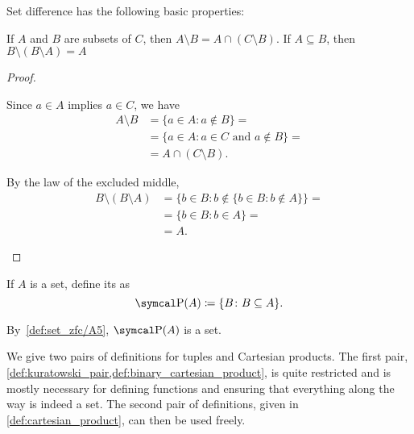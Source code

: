 \begin{proposition}\label{thm:set_difference_properties}
  Set difference has the following basic properties:
  \begin{thmenum}
     If \( A \) and \( B \) are subsets of \( C \), then \( A \setminus B = A \cap (C \setminus B) \).
     If \( A \subseteq B \), then \( B \setminus (B \setminus A) = A \)
  \end{thmenum}
\end{proposition}
\begin{proof}
  \begin{description}
     Since \( a \in A \) implies \( a \in C \), we have
    \begin{align*}
      A \setminus B
      &=
      \{ a \in A \colon a \not\in B \}
      = \\ &=
      \{ a \in A \colon a \in C \text{ and } a \not\in B \}
      = \\ &=
      A \cap (C \setminus B).
    \end{align*}

     By the law of the excluded middle,
    \begin{align*}
      B \setminus (B \setminus A)
      &=
      \{ b \in B \colon b \not\in \{ b \in B \colon b \not\in A \} \}
      = \\ &=
      \{ b \in B \colon b \in A \}
      = \\ &=
      A.
    \end{align*}
  \end{description}
\end{proof}

\begin{definition}\label{def:power_set}\cite[19]{Enderton1977}
  If \( A \) is a set, define its  as
  \begin{equation*}
    \Power(A) \coloneqq \{ B \colon B \subseteq A \}.
  \end{equation*}

  By~\ref{def:set_zfc/A5}, \( \Power(A) \) is a set.
\end{definition}

\begin{remark}
  We give two pairs of definitions for tuples and Cartesian products. The first pair, \cref{def:kuratowski_pair,def:binary_cartesian_product}, is quite restricted and is mostly necessary for defining functions and ensuring that everything along the way is indeed a set. The second pair of definitions, given in \cref{def:cartesian_product}, can then be used freely.
\end{remark}

